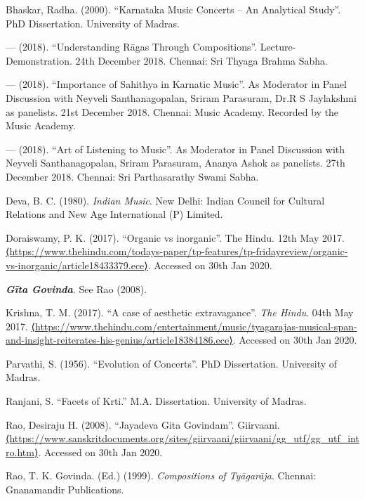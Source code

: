 \begin{thebibliography}{99}
\itemsep=0pt
 Bhaskar, Radha. (2000). “Karnataka Music Concerts – An Analytical Study”. PhD Dissertation. University of Madras.

  — (2018). “Understanding Rāgas Through Compositions”. Lecture-Demonstration. 24th December 2018. Chennai: Sri Thyaga Brahma Sabha.

  — (2018). “Importance of Sahithya in Karnatic Music”. As Moderator in Panel Discussion with Neyveli Santhanagopalan, Sriram Parasuram, Dr.R S Jaylakshmi as panelists. 21st December 2018. Chennai: Music Academy. Recorded by the Music Academy.

  — (2018). “Art of Listening to Music”. As Moderator in Panel Discussion with Neyveli Santhanagopalan, Sriram Parasuram, Ananya Ashok as panelists. 27th December 2018. Chennai: Sri Parthasarathy Swami Sabha.

  Deva, B. C. (1980). \textit{Indian Music}. New Delhi: Indian Council for Cultural Relations and New Age International (P) Limited.

  Doraiswamy, P. K. (2017). “Organic vs inorganic”. The Hindu. 12th May 2017. \url{⟨https://www.thehindu.com/todays-paper/tp-features/tp-fridayreview/organic-vs-inorganic/article18433379.ece⟩}. Accessed on 30th Jan 2020.

  \textbf{\textit{Gīta Govinda}}. See Rao (2008).

  Krishna, T. M. (2017). “A case of aesthetic extravagance”. \textit{The Hindu}. 04th May 2017. \url{⟨https://www.thehindu.com/entertainment/music/tyagarajas-musical-span-and-insight-reiterates-his-genius/article18384186.ece⟩}. Accessed on 30th Jan 2020.

  Parvathi, S. (1956). “Evolution of Concerts”. PhD Dissertation. University of Madras.

  Ranjani, S. “Facets of Krti.” M.A. Dissertation. University of Madras.

  Rao, Desiraju H. (2008). “Jayadeva Gita Govindam”. Giirvaani. \url{⟨https://www.sanskritdocuments.org/sites/giirvaani/giirvaani/gg_utf/gg_utf_intro.htm⟩}. Accessed on 30th Jan 2020.

  Rao, T. K. Govinda. (Ed.) (1999). \textit{Compositions of Tyāgarāja}. Chennai: Gnanamandir Publications.


\end{thebibliography}
